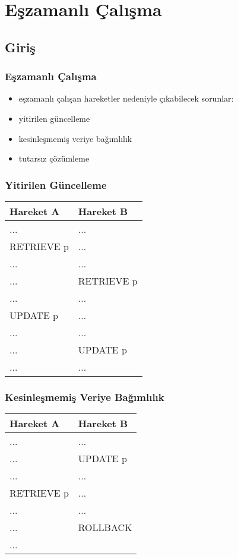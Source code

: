 \documentclass[dvipsnames]{beamer}
\theoremstyle{plain}
\begin{document}
\section{Eşzamanlı Çalışma}

\subsection{Giriş}

\begin{frame}
  \frametitle{Eşzamanlı Çalışma}

  \begin{itemize}
    \item eşzamanlı çalışan hareketler nedeniyle çıkabilecek sorunlar:

    \bigskip
    \item yitirilen güncelleme
    \item kesinleşmemiş veriye bağımlılık
    \item tutarsız çözümleme
  \end{itemize}
\end{frame}

\begin{frame}[fragile]
  \frametitle{Yitirilen Güncelleme}

  \begin{table}
    \begin{tabular}{ll}
Hareket A     & Hareket B    \\\hline
...           & ...          \\\pause
RETRIEVE p    & ...          \\\pause
...           & ...          \\
...           & RETRIEVE p   \\\pause
...           & ...          \\
UPDATE p      & ...          \\\pause
...           & ...          \\
...           & UPDATE p     \\
...           & ...
    \end{tabular}
  \end{table}
\end{frame}

\begin{frame}[fragile]
  \frametitle{Kesinleşmemiş Veriye Bağımlılık}


    \begin{table}
      \begin{tabular}{ll}
Hareket A  & Hareket B\\\hline
...        & ...      \\\pause
...        & UPDATE p \\\pause
...        & ...      \\
RETRIEVE p & ...      \\\pause
...        & ...      \\
...        & ROLLBACK \\
...        &
      \end{tabular}
    \end{table}
\end{frame}
\end{document}
